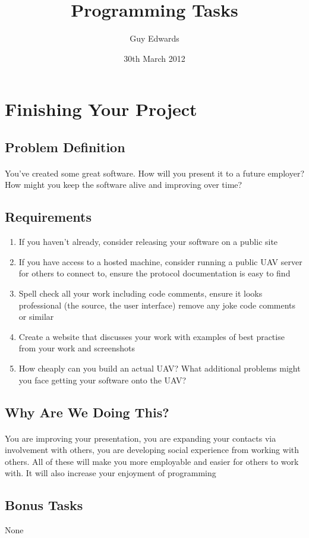\documentclass[11pt]{book}
\title{\textbf{Programming Tasks}}
\author{Guy Edwards}
\date{30th March 2012}
\begin{document}
\section{Finishing Your Project}

\subsection{Problem Definition}

\paragraph{} You've created some great software. How will you present it to a
future employer? How might you keep the software alive and improving over
time?

\subsection{Requirements}

\begin{enumerate}
\item If you haven't already, consider releasing your software on a public site
\item If you have access to a hosted machine, consider running a public UAV server for others to connect to, ensure the protocol documentation is easy to find
\item Spell check all your work including code comments, ensure it looks professional (the source, the user interface) remove any joke code comments or similar
\item Create a website that discusses your work with examples of best practise from your work and screenshots
\item How cheaply can you build an actual UAV? What additional problems might you face getting your software onto the UAV?
\end{enumerate}

\subsection{Why Are We Doing This?}

\paragraph{} You are improving your presentation, you are expanding your
contacts via involvement with others, you are developing social experience
from working with others. All of these will make you more employable and
easier for others to work with. It will also increase your enjoyment of
programming

\subsection{Bonus Tasks}

None

\clearpage
\end{document}
